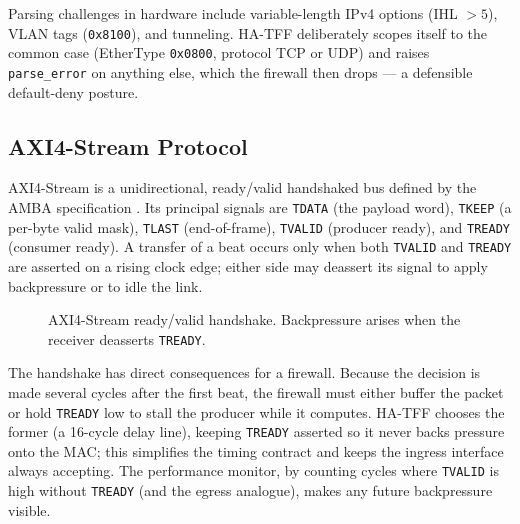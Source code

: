 \documentclass[12pt,twoside,openright]{book}
\begin{document}
Parsing challenges in hardware include variable-length IPv4 options (IHL $>5$), VLAN tags
(\texttt{0x8100}), and tunneling. HA-TFF deliberately scopes itself to the common case
(EtherType \texttt{0x0800}, protocol TCP or UDP) and raises \texttt{parse\_error} on anything else,
which the firewall then drops --- a defensible default-deny posture.

\subsection{AXI4-Stream Protocol}
\label{sec:axi}

AXI4-Stream is a unidirectional, ready/valid handshaked bus defined by the AMBA specification
\cite{axi2017}. Its principal signals are \texttt{TDATA} (the payload word), \texttt{TKEEP} (a
per-byte valid mask), \texttt{TLAST} (end-of-frame), \texttt{TVALID} (producer ready), and
\texttt{TREADY} (consumer ready). A transfer of a beat occurs only when both \texttt{TVALID} and
\texttt{TREADY} are asserted on a rising clock edge; either side may deassert its signal to apply
backpressure or to idle the link.

\begin{figure}[H]
\centering
\footnotesize
{}
\caption{AXI4-Stream ready/valid handshake. Backpressure arises when the receiver deasserts
\texttt{TREADY}.}
\label{fig:handshake}
\end{figure}

The handshake has direct consequences for a firewall. Because the decision is made several cycles
after the first beat, the firewall must either buffer the packet or hold \texttt{TREADY} low to
stall the producer while it computes. HA-TFF chooses the former (a 16-cycle delay line), keeping
\texttt{TREADY} asserted so it never backs pressure onto the MAC; this simplifies the timing
contract and keeps the ingress interface always accepting. The performance monitor, by counting
cycles where \texttt{TVALID} is high without \texttt{TREADY} (and the egress analogue), makes any
future backpressure visible.
\end{document}
